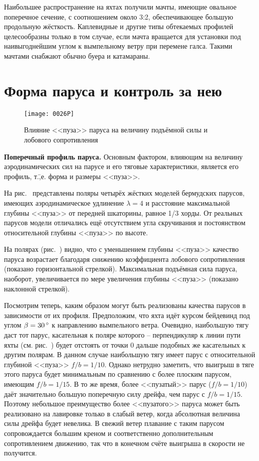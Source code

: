 Наибольшее распространение на яхтах получили мачты, имеющие овальное
поперечное сечение, с соотношением около 3:2, обеспечивающее большую
продольную жёсткость. Каплевидные и другие типы обтекаемых профилей
целесообразны только в том случае, если мачта вращается для установки
под наивыгоднейшим углом к вымпельному ветру при перемене
галса. Такими мачтами снабжают обычно буера и катамараны.

\section{Форма паруса и контроль за нею}

\begin{figure}[htb]
  \centering
  \texttt{[image: 0026P]}
  \caption{Влияние <<пуза>> паруса на величину подъёмной силы и лобового сопротивления}
  \label{fig:26}
\end{figure}

\textbf{Поперечный профиль паруса.}
Основным фактором, влияющим на величину аэродинамических сил на парусе
и его тяговые характеристики, является его профиль, т.\=,е. форма и
размеры <<пуза>>.

На рис.~ представлены поляры четырёх жёстких моделей
бермудских парусов, имеющих аэродинамическое удлинение $\lambda = 4$ и
расстояние максимальной глубины <<пуза>> от передней шкаторины, равное
1/3 хорды. От реальных парусов модели отличались ещё отсутствием угла
скручивания и постоянством относительной глубины <<пуза>> по высоте.

На полярах (рис.~) видно, что с уменьшением глубины <<пуза>>
качество паруса возрастает благодаря снижению коэффициента лобового
сопротивления (показано горизонтальной стрелкой). Максимальная
подъёмная сила паруса, наоборот, увеличивается по мере увеличения
глубины <<пуза>> (показано наклонной стрелкой).

Посмотрим теперь, каким образом могут быть реализованы качества
парусов в зависимости от их профиля. Предположим, что яхта идёт курсом
бейдевинд под углом $\beta = 30\,^\circ$ к направлению вымпельного
ветра. Очевидно, наибольшую тягу даст тот парус, касательная к поляре
которого \--- перпендикуляр к линии пути яхты (см. рис.~)
будет отстоять от точки 0 дальше подобных же касательных к другим
полярам. В данном случае наибольшую тягу имеет парус с относительной
глубиной <<пуза>> $f/b=1/10$. Однако нетрудно заметить, что выигрыш в
тяге этого паруса будет минимальным по сравнению с более плоским
парусом, имеющим $f/b = 1/15$. В то же время, более <<пузатый>> парус
($f/b = 1/10$) даёт значительно большую поперечную силу дрейфа, чем
парус с $f/b = 1/15$. Поэтому небольшое преимущество более
<<пузатого>> паруса может быть реализовано на лавировке только в
слабый ветер, когда абсолютная величина силы дрейфа будет невелика. В
свежий ветер плавание с таким парусом сопровождается большим креном и
соответственно дополнительным сопротивлением движению, так что в
конечном счёте выигрыша в скорости не получится.

